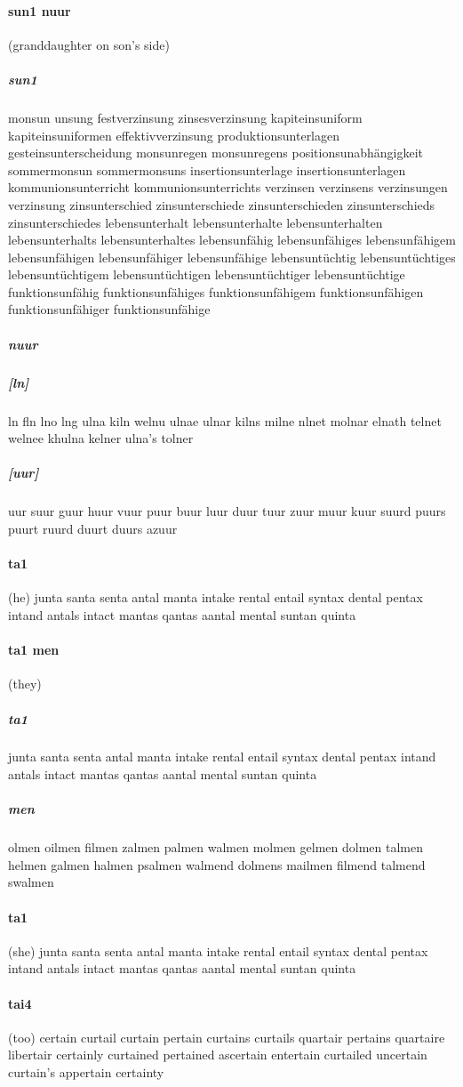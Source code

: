 \documentclass{article}
\begin{document}
\paragraph{sun1 nuur}(granddaughter on son's side) \subparagraph{sun1}monsun
unsung
festverzinsung
zinsesverzinsung
kapiteinsuniform
kapiteinsuniformen
effektivverzinsung
produktionsunterlagen
gesteinsunterscheidung
monsunregen monsunregens
positionsunabhängigkeit
sommermonsun sommermonsuns
insertionsunterlage insertionsunterlagen
kommunionsunterricht kommunionsunterrichts
verzinsen verzinsens verzinsungen verzinsung
zinsunterschied zinsunterschiede zinsunterschieden zinsunterschieds zinsunterschiedes
lebensunterhalt lebensunterhalte lebensunterhalten lebensunterhalts lebensunterhaltes
lebensunfähig lebensunfähiges lebensunfähigem lebensunfähigen lebensunfähiger lebensunfähige
lebensuntüchtig lebensuntüchtiges lebensuntüchtigem lebensuntüchtigen lebensuntüchtiger lebensuntüchtige
funktionsunfähig funktionsunfähiges funktionsunfähigem funktionsunfähigen funktionsunfähiger funktionsunfähige
\subparagraph{nuur}\subparagraph{[ln]}ln
fln
lno
lng
ulna
kiln
welnu
ulnae
ulnar
kilns
milne
nlnet
molnar
elnath
telnet
welnee
khulna
kelner
ulna's
tolner
\subparagraph{[uur]}uur
suur
guur
huur
vuur
puur
buur
luur
duur
tuur
zuur
muur
kuur
suurd
puurs
puurt
ruurd
duurt
duurs
azuur
\paragraph{ta1}(he) junta
santa
senta
antal
manta
intake
rental
entail
syntax
dental
pentax
intand
antals
intact
mantas
qantas
aantal
mental
suntan
quinta
\paragraph{ta1 men}(they) \subparagraph{ta1}junta
santa
senta
antal
manta
intake
rental
entail
syntax
dental
pentax
intand
antals
intact
mantas
qantas
aantal
mental
suntan
quinta
\subparagraph{men}olmen
oilmen
filmen
zalmen
palmen
walmen
molmen
gelmen
dolmen
talmen
helmen
galmen
halmen
psalmen
walmend
dolmens
mailmen
filmend
talmend
swalmen
\paragraph{ta1}(she) junta
santa
senta
antal
manta
intake
rental
entail
syntax
dental
pentax
intand
antals
intact
mantas
qantas
aantal
mental
suntan
quinta
\paragraph{tai4}(too) certain
curtail
curtain
pertain
curtains
curtails
quartair
pertains
quartaire
libertair
certainly
curtained
pertained
ascertain
entertain
curtailed
uncertain
curtain's
appertain
certainty
\end{document}
